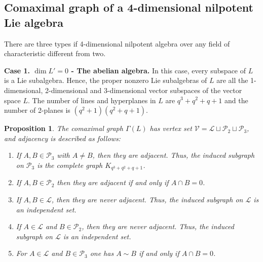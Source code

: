 \documentclass[11pt]{amsart}
\theoremstyle{plain}
\newtheorem{proposition}[theorem]{Proposition}
\begin{document}
\subsection{Comaximal graph of a 4-dimensional nilpotent Lie algebra}
There are three types if 4-dimensional nilpotent algebra over any field of characteristic different from two.
\smallskip

\textbf{Case 1. $\dim L'=0$ - The abelian algebra.} In this case, every subspace of $L$ is a Lie subalgebra. Hence, the proper nonzero Lie subalgebras of $L$ are all the 1-dimensional, 2-dimensional and 3-dimensional vector subspaces of the vector space $L$. The number of lines and hyperplanes in $L$ are $q^3+q^2+q+1$ and the number of 2-planes is $(q^2+1)(q^2+q+1)$.  

\begin{proposition}\label{ab}
The comaximal graph $\Gamma(L)$ has vertex set $\mathcal{V} = \mathcal{L} \sqcup \mathcal{P}_2 \sqcup \mathcal{P}_3$, and adjacency is described as follows:
\begin{enumerate}
\item If $A, B\in \mathcal{P}_3$ with $A\neq B$, then they are adjacent. Thus, the induced subgraph on $\mathcal{P}_3$ is the complete graph $K_{q^3+q^2+q+1}$.
\item If $A, B\in \mathcal{P}_2$ then they are adjacent if and only if $A\cap B=0$.
\item If $A, B\in \mathcal{L}$, then they are never adjacent. Thus, the induced subgraph on $\mathcal{L}$ is an independent set.
\item If $A\in \mathcal{L}$ and $B\in \mathcal{P}_2$, then they are never adjacent. Thus, the induced subgraph on $\mathcal{L}$ is an independent set.
\item For $A\in \mathcal{L}$ and $B\in \mathcal{P}_3$ one has $A\sim B$ if and only if $A\cap B=0$.
\end{enumerate}
\end{proposition}
\end{document}

